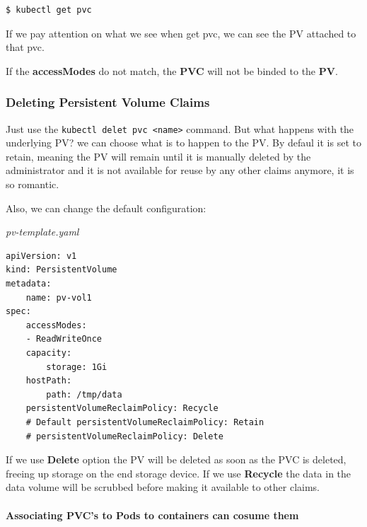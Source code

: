 \documentclass{article}
\newenvironment{blocktemplate}[1]{%
    \tcolorbox[beamer,%
    noparskip,breakable,
    colframe=Blue,%
    colbacklower=LimeGreen!75!LightGreen,%
    title=#1]}%
    {\endtcolorbox}
\newenvironment{blocktemplateIII}[1]{%
    \tcolorbox[beamer,%
    noparskip,breakable,
    ,colframe=Red,%
    colbacklower=LimeGreen!75!LightGreen,%
    title=#1]}%
    {\endtcolorbox}
\newenvironment{codetemplate}[1][]{%
  \mybasecolorbox[#1]
  \itshape
}{%
  \endmybasecolorbox
}
\begin{document}
\begin{codetemplate}{}
\begin{verbatim}
$ kubectl get pvc
\end{verbatim}
\end{codetemplate}

\begin{blocktemplate}{NOTE}
If we pay attention on what we see when get pvc, we can see the PV attached to that pvc.
\end{blocktemplate}

\begin{blocktemplateIII}{WARNING}
If the \textbf{accessModes} do not match, the \textbf{PVC} will not be binded to the \textbf{PV}.
\end{blocktemplateIII}

\subsubsection{Deleting Persistent Volume Claims}

Just use the  \verb|kubectl delet pvc <name>| command. But what happens with the underlying PV? we can choose what is to happen to the PV. By defaul it is set to retain, meaning the PV will remain until it is manually deleted by the administrator and it is not available for reuse by any other claims anymore, it is so romantic.

Also, we can change the default configuration:

\begin{codetemplate}{pv-template.yaml}
\begin{verbatim}
apiVersion: v1
kind: PersistentVolume
metadata:
    name: pv-vol1
spec:
    accessModes:
    - ReadWriteOnce
    capacity:
        storage: 1Gi
    hostPath:
        path: /tmp/data
    persistentVolumeReclaimPolicy: Recycle
    # Default persistentVolumeReclaimPolicy: Retain
    # persistentVolumeReclaimPolicy: Delete
\end{verbatim}
\end{codetemplate}

If we use \textbf{Delete} option the PV will be deleted as soon as the PVC is deleted, freeing up storage on the end storage device. If we use \textbf{Recycle} the data in the data volume will be scrubbed before making it available to other claims.

\paragraph{Associating PVC's to Pods to containers can cosume them}
\end{document}
